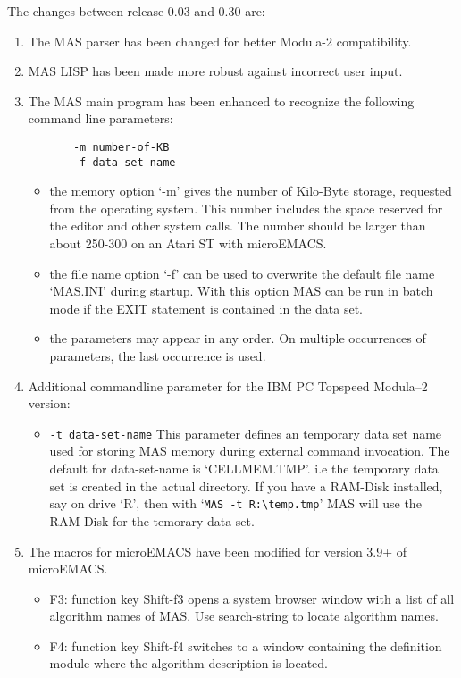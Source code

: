 The changes between release 0.03 and 0.30 are:
\begin{enumerate}
\item The MAS parser has been changed for better Modula-2
      compatibility.
\item MAS LISP has been made more robust against incorrect
      user input.
\item The MAS main program has been enhanced to recognize
      the following command line parameters:
\begin{verbatim}
       -m number-of-KB
       -f data-set-name
\end{verbatim}
      \begin{itemize}
      \item the memory option `-m' gives the number of Kilo-Byte
            storage, requested from the operating system. This
            number includes the space reserved for the editor and
            other system calls. The number should be larger than
            about 250-300 on an Atari ST with microEMACS.
      \item the file name option `-f' can be used to overwrite the
            default file name `MAS.INI' during startup. With this
            option MAS can be run in batch mode if the EXIT
            statement is contained in the data set.
      \item the parameters may appear in any order.
            On multiple occurrences of parameters, the last
            occurrence is used.
      \end{itemize}
\item Additional commandline parameter for the 
      IBM PC Topspeed Modula--2 version: 
      \begin{itemize}
      \item \verb/-t data-set-name/
            This parameter defines an temporary data set name 
            used for storing MAS memory during external command 
            invocation. The default for data-set-name is 
            `CELLMEM.TMP'. i.e the temporary data set is created in 
            the actual directory. If you have a RAM-Disk installed, 
            say on drive `R', then with `\verb/MAS -t R:\temp.tmp/'   
            MAS will use the RAM-Disk for the temorary data set.
            \end{itemize}
\item The macros for microEMACS have been modified for version
      3.9+ of microEMACS.
      \begin{itemize}
      \item F3: function key Shift-f3 opens a system browser window
              with a list of all algorithm names of MAS. Use
              search-string to locate algorithm names.
      \item F4: function key Shift-f4 switches to a window containing
              the definition module where the algorithm description
              is located.
      \end{itemize}
\end{enumerate}

